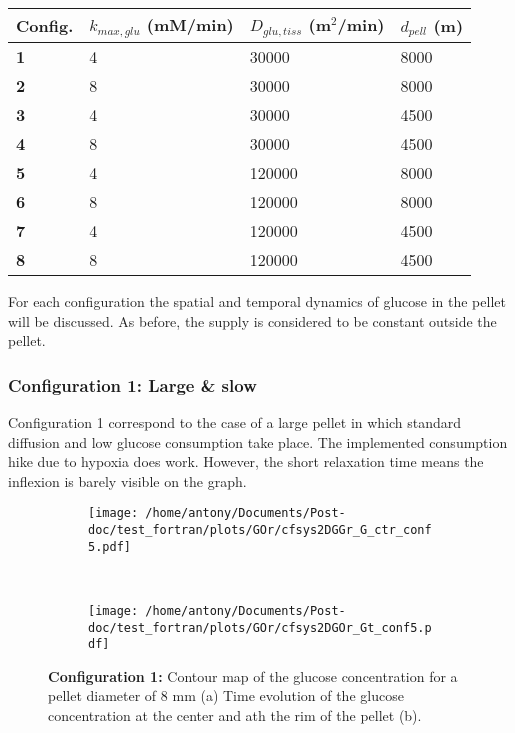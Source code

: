 \documentclass[11pt,a4paper]{article}
\begin{document}
\begin{table}[h]
	\begin{center}
		\begin{tabular}{ |p{15mm}|p{41mm}|p{34mm}|p{27mm}|}
			\hline
			\textbf{Config.} & $k_{max,glu}$ (mM/min) & $D_{glu,tiss}$ (\textmu m$^2$/min) & $d_{pell}$ (\textmu m) \\
			\hline
			\textbf{1} & 4 & 30000 & 8000 \\
			\hline
			\textbf{2} & 8 & 30000 & 8000 \\
			\hline
			\textbf{3} & 4 & 30000 & 4500 \\
			\hline
			\textbf{4} & 8 & 30000 & 4500 \\
			\hline
			\textbf{5} & 4 & 120000 & 8000 \\
			\hline
			\textbf{6} & 8 & 120000 & 8000 \\
			\hline
			\textbf{7} & 4 & 120000 & 4500 \\
			\hline
			\textbf{8} & 8 & 120000 & 4500 \\
			\hline
		\end{tabular}
	\end{center}
\end{table}

For each configuration the spatial and temporal dynamics of glucose in the pellet will be discussed. As before, the supply is considered to be constant outside the pellet.

\subsubsection{Configuration 1: Large \& slow}
Configuration 1 correspond to the case of a large pellet in which standard diffusion and low glucose consumption take place. The implemented consumption hike due to hypoxia does work. However, the short relaxation time means the inflexion is barely visible on the graph.

\begin{figure}[ht!]
	\begin{subfigure}{0.45\textwidth}
	\centering
	\texttt{[image: /home/antony/Documents/Post-doc/test\_fortran/plots/GOr/cfsys2DGGr\_G\_ctr\_conf5.pdf]}
	\caption{ \label{G_ctr_conf5}}
	\end{subfigure}
	~~
	\begin{subfigure}{0.45\textwidth}
	\texttt{[image: /home/antony/Documents/Post-doc/test\_fortran/plots/GOr/cfsys2DGOr\_Gt\_conf5.pdf]}
		\caption{ \label{Gt_conf5}}
	\end{subfigure}
	\caption{\textbf{Configuration 1:} Contour map of the glucose concentration for a pellet diameter of 8 mm (a) Time evolution of the glucose concentration at the center and ath the rim of the pellet (b). \label{G_t_ctr_1}}
\end{figure}
\end{document}
